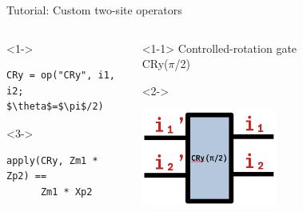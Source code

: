 \begin{frame}[fragile]{Tutorial: Custom two-site operators}

\begin{columns}

\begin{column}{5.5cm}

\begin{onlyenv}<1->
\begin{lstlisting}[language=JuliaLocal, style=julia, mathescape, basicstyle=\scriptsize\ttfamily]
CRy = op("CRy", i1, i2; $\theta$=$\pi$/2)
\end{lstlisting}
\end{onlyenv}

\begin{onlyenv}<3->
~\\
\begin{lstlisting}[language=JuliaLocal, style=julia, mathescape, basicstyle=\scriptsize\ttfamily]
apply(CRy, Zm1 * Zp2) ==
      Zm1 * Xp2
\end{lstlisting}
\end{onlyenv}

\end{column}

\begin{column}{4.5cm}

\begin{onlyenv}<1-1>
Controlled-rotation gate \\
CRy($\pi$/2)
\end{onlyenv}

\begin{onlyenv}<2->
\vspace*{0.0cm}
\begin{center}
\includegraphics[width=0.5\textwidth]{
  slides/assets/CRy_pi_by_2.png
}
\end{center}
\vspace*{0.0cm}
\end{onlyenv}



\end{column}
\end{columns}
\end{frame}
